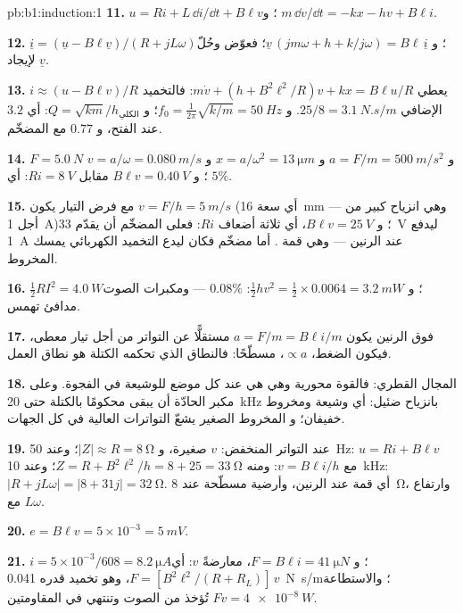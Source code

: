 \begin{solution}{pb:b1:induction:1}
\textbf{11.} $u = Ri + L\,\dd i/\dd t + B\ell v$؛ و $m\,\dd v/\dd t = -kx - hv + B\ell i$.

\textbf{12.} $\underline i = (\underline u - B\ell\underline v)/(R + jL\omega)$؛ و $\underline v\,(jm\omega + h +
k/j\omega) = B\ell\,\underline i$؛ فعوّض وحُلّ لإيجاد $\underline v$.

\textbf{13.} $i \approx (u - B\ell v)/R$ يعطي $m\dot v + (h + B^2\ell^2/R)v + kx =
B\ell u/R$: فالتخميد الإضافي $25/8 = \qty{3.1}{N.s/m}$. و $f_0 = \tfrac1{2\pi}\sqrt{k/m} =
\qty{50}{Hz}$؛ و $Q = \sqrt{km}/h_{\text{الكلي}}$: أي $3.2$ عند الفتح، و $0.77$ مع
المضخّم.

\textbf{14.} $F = \qty{5.0}{N}$ و $a = F/m = \qty{500}{m/s^2}$ و $x = a/\omega^2 =
\qty{13}{\micro m}$ و $v = a/\omega = \qty{0.080}{m/s}$؛ و $B\ell v = \qty{0.40}{V}$ مقابل
$Ri = \qty{8}{V}$: أي $5\%$.

\textbf{15.} مع فرض التيار يكون $v = F/h = \qty{5}{m/s}$ (أي
سعة \qty{16}{mm} --- وهي انزياح كبير من أجل \qty{1}{A})؛ و $B\ell v =
\qty{25}{V}$، أي ثلاثة أضعاف $Ri$: فعلى المضخّم أن يقدّم \qty{33}{V} ليدفع
\qty{1}{A} عند الرنين --- وهي قمة . أما مضخّم 
فكان ليدع التخميد الكهربائي يمسك المخروط.

\textbf{16.} $\tfrac12RI^2 = \qty{4.0}{W}$؛ و $\tfrac12hv^2 = \tfrac12 \times 0.0064 =
\qty{3.2}{mW}$:  $0.08\%$ --- ومكبرات الصوت مدافئ
تهمس.

\textbf{17.} فوق الرنين يكون $a = F/m = B\ell i/m$ مستقلًّا عن
التواتر من أجل تيار معطى، فيكون الضغط، $\propto a$، مسطّحًا:
فالنطاق الذي تحكمه الكتلة هو نطاق العمل.

\textbf{18.} المجال القطري: فالقوة محورية وهي هي عند كل
موضع للوشيعة في الفجوة. وعلى مكبر الحادّة أن يبقى محكومًا بالكتلة
حتى \qty{20}{kHz} بانزياح ضئيل: أي وشيعة ومخروط خفيفان؛ و
المخروط الصغير يشعّ التواترات العالية في كل الجهات.

\textbf{19.} عند التواتر المنخفض: $v$ صغيرة، و $|Z| \approx R = \qty{8}{\ohm}$؛ وعند
\qty{50}{Hz}: $u = Ri + B\ell v$ مع $v = B\ell i/h$: ومنه $Z = R + B^2\ell^2/h = 8 + 25 =
\qty{33}{\ohm}$؛ وعند \qty{10}{kHz}: $|R + jL\omega| = |8 + 31j| = \qty{32}{\ohm}$. أي
قمة عند الرنين، وأرضية مسطّحة عند \qty{8}{\ohm}، وارتفاع مع $L\omega$.

\textbf{20.} $e = B\ell v = 5 \times 10^{-3} = \qty{5}{mV}$.

\textbf{21.} $i = 5 \times 10^{-3}/608 = \qty{8.2}{\micro A}$؛ و $F = B\ell i = \qty{41}{\micro N}$،
معارضةً $v$: أي $F = [B^2\ell^2/(R + R_L)]\,v$، وهو تخميد قدره \qty{0.041}{N.s/m}؛
والاستطاعة $Fv = \qty{4e-8}{W}$ تُؤخذ من الصوت وتنتهي في
المقاومتين.


\end{solution}
